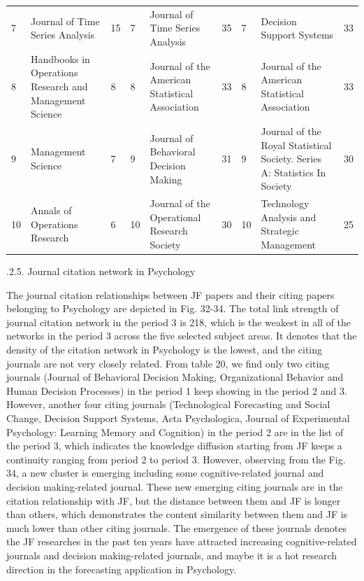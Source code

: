 \documentclass[11pt,a4paper]{elsarticle} %
\begin{document}
\begin{landscape}
\begin{table}[!htbp]
{\begin{tabular}{p{1.5cm}<{\centering} p{6cm}<{\centering} p{1.5cm}<{\centering}|p{1.5cm}<{\centering} p{6cm}<{\centering} p{1.5cm}<{\centering}|p{1.5cm}<{\centering} p{6cm}<{\centering} p{1.5cm}<{\centering}}
7 & Journal of Time Series Analysis & 15 & 7 & Journal of Time Series Analysis & 35 & 7 & Decision Support Systems & 33\\
8 & Handbooks in Operations Research and Management Science & 8 & 8 & Journal of the American Statistical Association & 33 & 8 & Journal of the American Statistical Association & 33\\
9 & Management Science & 7 & 9 & Journal of Behavioral Decision Making & 31 & 9 & Journal of the Royal Statistical Society. Series A: Statistics In Society & 30\\
10 & Annals of Operations Research & 6 & 10 & Journal of the Operational Research Society & 30 & 10 & Technology Analysis and Strategic Management & 25\\
  \hline
  \hline
    \end{tabular}}
\end{table}
\end{landscape}

.2.5. Journal citation network in Psychology

The journal citation relationships between JF papers and their citing
papers belonging to Psychology are depicted in Fig. 32-34. The total
link strength of journal citation network in the period 3 is 218, which
is the weakest in all of the networks in the period 3 across the five
selected subject areas. It denotes that the density of the citation
network in Psychology is the lowest, and the citing journals are not
very closely related. From table 20, we find only two citing journals
(Journal of Behavioral Decision Making, Organizational Behavior and
Human Decision Processes) in the period 1 keep showing in the period 2
and 3. However, another four citing journals (Technological Forecasting
and Social Change, Decision Support Systems, Acta Psychologica, Journal
of Experimental Psychology: Learning Memory and Cognition) in the period
2 are in the list of the period 3, which indicates the knowledge
diffusion starting from JF keeps a continuity ranging from period 2 to
period 3. However, observing from the Fig. 34, a new cluster is emerging
including some cognitive-related journal and decision making-related
journal. These new emerging citing journals are in the citation
relationship with JF, but the distance between them and JF is longer
than others, which demonstrates the content similarity between them and
JF is much lower than other citing journals. The emergence of these
journals denotes the JF researches in the past ten years have attracted
increasing cognitive-related journals and decision making-related
journals, and maybe it is a hot research direction in the forecasting
application in Psychology.
\end{document}

